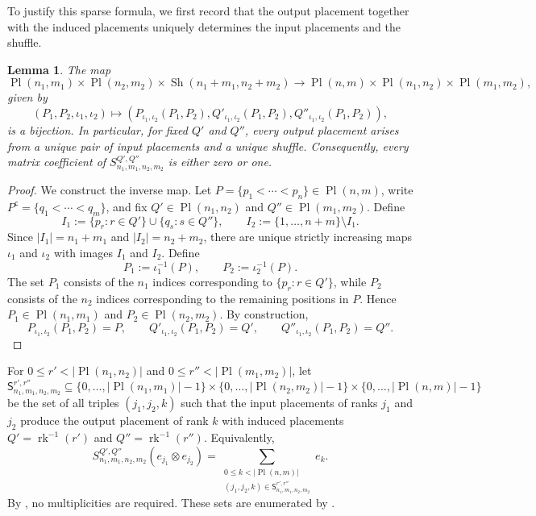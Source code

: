 \documentclass{amsart}
\newtheorem{lemma}[theorem]{Lemma}
\theoremstyle{definition}
\theoremstyle{remark}
\begin{document}
To justify this sparse formula, we first record that the output placement together with the induced placements uniquely determines the input placements and the shuffle.

\begin{lemma}
\label{lem:shuffle_pullback}
The map
\[
    \operatorname{Pl}(n_1,m_1)
    \times
    \operatorname{Pl}(n_2,m_2)
    \times
    \operatorname{Sh}(n_1+m_1,n_2+m_2)
    \longrightarrow
    \operatorname{Pl}(n,m)
    \times
    \operatorname{Pl}(n_1,n_2)
    \times
    \operatorname{Pl}(m_1,m_2),
\]
given by
\[
    (P_1,P_2,\iota_1,\iota_2)
    \longmapsto
    \left(
        P_{\iota_1,\iota_2}(P_1,P_2),
        Q'_{\iota_1,\iota_2}(P_1,P_2),
        Q''_{\iota_1,\iota_2}(P_1,P_2)
    \right),
\]
is a bijection. In particular, for fixed $Q'$ and $Q''$, every output
placement arises from a unique pair of input placements and a unique
shuffle. Consequently, every matrix coefficient of
$S^{Q',Q''}_{n_1,m_1,n_2,m_2}$ is either zero or one.
\end{lemma}

\begin{proof}
We construct the inverse map. Let
$P=\{p_1<\cdots<p_n\}\in\operatorname{Pl}(n,m)$, write
$P^{\mathsf c}=\{q_1<\cdots<q_m\}$, and fix
$Q'\in\operatorname{Pl}(n_1,n_2)$ and
$Q''\in\operatorname{Pl}(m_1,m_2)$. Define
\[
    I_1
    :=
    \{p_r:r\in Q'\}
    \cup
    \{q_s:s\in Q''\},
    \qquad
    I_2
    :=
    \{1,\ldots,n+m\}\setminus I_1.
\]
Since $|I_1|=n_1+m_1$ and $|I_2|=n_2+m_2$, there are unique strictly
increasing maps $\iota_1$ and $\iota_2$ with images $I_1$ and $I_2$.
Define
\[
    P_1:=\iota_1^{-1}(P),
    \qquad
    P_2:=\iota_2^{-1}(P).
\]
The set $P_1$ consists of the $n_1$ indices corresponding to
$\{p_r:r\in Q'\}$, while $P_2$ consists of the $n_2$ indices
corresponding to the remaining positions in $P$. Hence
$P_1\in\operatorname{Pl}(n_1,m_1)$ and
$P_2\in\operatorname{Pl}(n_2,m_2)$. By construction,
\[
    P_{\iota_1,\iota_2}(P_1,P_2)=P,
    \qquad
    Q'_{\iota_1,\iota_2}(P_1,P_2)=Q',
    \qquad
    Q''_{\iota_1,\iota_2}(P_1,P_2)=Q''.
\]
\end{proof}

For
$0\leq r'<|\operatorname{Pl}(n_1,n_2)|$ and
$0\leq r''<|\operatorname{Pl}(m_1,m_2)|$, let
\[
    \mathsf{S}^{r',r''}_{n_1,m_1,n_2,m_2}
    \subseteq
    \{0,\ldots,|\operatorname{Pl}(n_1,m_1)|-1\}
    \times
    \{0,\ldots,|\operatorname{Pl}(n_2,m_2)|-1\}
    \times
    \{0,\ldots,|\operatorname{Pl}(n,m)|-1\}
\]
be the set of all triples $(j_1,j_2,k)$ such that the input placements
of ranks $j_1$ and $j_2$ produce the output placement of rank $k$ with
induced placements $Q'=\operatorname{rk}^{-1}(r')$ and
$Q''=\operatorname{rk}^{-1}(r'')$. Equivalently,
\[
    S^{Q',Q''}_{n_1,m_1,n_2,m_2}
    \left(e_{j_1}\otimes e_{j_2}\right)
    =
    \sum_{\substack{
        0\leq k<|\operatorname{Pl}(n,m)|\\
        (j_1,j_2,k)\in
        \mathsf{S}^{r',r''}_{n_1,m_1,n_2,m_2}
    }}
    e_k.
\]
By , no multiplicities are required. These
sets are enumerated by .
\end{document}
